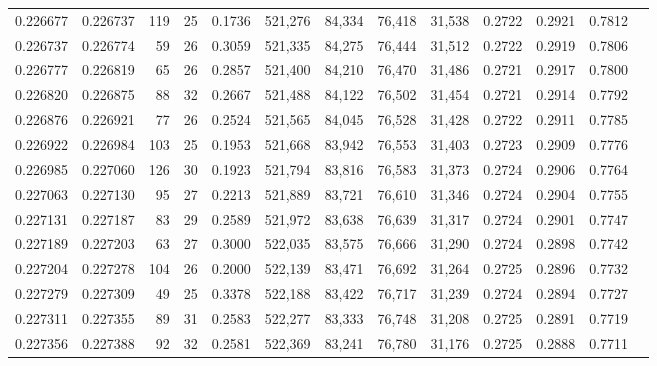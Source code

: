 \begin{tabular}{rrrrrrrrrrrrr}
0.226677 & 0.226737 & 119 &  25 &                                     0.1736 & 521,276 &  84,334 &  76,418 &  31,538 & 0.2722 & 0.2921 & 0.7812 \\
0.226737 & 0.226774 &  59 &  26 &                                     0.3059 & 521,335 &  84,275 &  76,444 &  31,512 & 0.2722 & 0.2919 & 0.7806 \\
0.226777 & 0.226819 &  65 &  26 &                                     0.2857 & 521,400 &  84,210 &  76,470 &  31,486 & 0.2721 & 0.2917 & 0.7800 \\
0.226820 & 0.226875 &  88 &  32 &                                     0.2667 & 521,488 &  84,122 &  76,502 &  31,454 & 0.2721 & 0.2914 & 0.7792 \\
0.226876 & 0.226921 &  77 &  26 &                                     0.2524 & 521,565 &  84,045 &  76,528 &  31,428 & 0.2722 & 0.2911 & 0.7785 \\
0.226922 & 0.226984 & 103 &  25 &                                     0.1953 & 521,668 &  83,942 &  76,553 &  31,403 & 0.2723 & 0.2909 & 0.7776 \\
0.226985 & 0.227060 & 126 &  30 &                                     0.1923 & 521,794 &  83,816 &  76,583 &  31,373 & 0.2724 & 0.2906 & 0.7764 \\
0.227063 & 0.227130 &  95 &  27 &                                     0.2213 & 521,889 &  83,721 &  76,610 &  31,346 & 0.2724 & 0.2904 & 0.7755 \\
0.227131 & 0.227187 &  83 &  29 &                                     0.2589 & 521,972 &  83,638 &  76,639 &  31,317 & 0.2724 & 0.2901 & 0.7747 \\
0.227189 & 0.227203 &  63 &  27 &                                     0.3000 & 522,035 &  83,575 &  76,666 &  31,290 & 0.2724 & 0.2898 & 0.7742 \\
0.227204 & 0.227278 & 104 &  26 &                                     0.2000 & 522,139 &  83,471 &  76,692 &  31,264 & 0.2725 & 0.2896 & 0.7732 \\
0.227279 & 0.227309 &  49 &  25 &                                     0.3378 & 522,188 &  83,422 &  76,717 &  31,239 & 0.2724 & 0.2894 & 0.7727 \\
0.227311 & 0.227355 &  89 &  31 &                                     0.2583 & 522,277 &  83,333 &  76,748 &  31,208 & 0.2725 & 0.2891 & 0.7719 \\
0.227356 & 0.227388 &  92 &  32 &                                     0.2581 & 522,369 &  83,241 &  76,780 &  31,176 & 0.2725 & 0.2888 & 0.7711 \\

\end{tabular}
